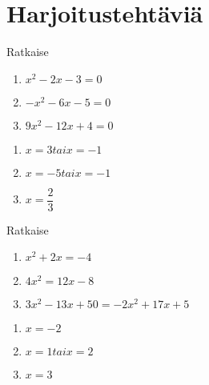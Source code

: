 \section{Harjoitustehtäviä}

\begin{tehtava}
    Ratkaise
    \begin{enumerate}
        \item $x^2 - 2x - 3 = 0$
        \item $-x^2 - 6x - 5 = 0$
        \item $9x^2 - 12x + 4 = 0$
    \end{enumerate}
    \begin{vastaus}
        \begin{enumerate}
            \item $x = 3 tai x = -1$
            \item $x = -5 tai x = -1$
            \item $x = \dfrac{2}{3}$
        \end{enumerate}
    \end{vastaus}
\end{tehtava}

\begin{tehtava}
    Ratkaise
    \begin{enumerate}
        \item $x^2 + 2x = -4$
        \item $4x^2 = 12x - 8$
        \item $3x^2 - 13x + 50 = -2x^2 + 17x + 5$
    \end{enumerate}
    \begin{vastaus}
        \begin{enumerate}
            \item $x = -2$
            \item $x = 1 tai x = 2$
            \item $x = 3$
        \end{enumerate}
    \end{vastaus}
\end{tehtava}

